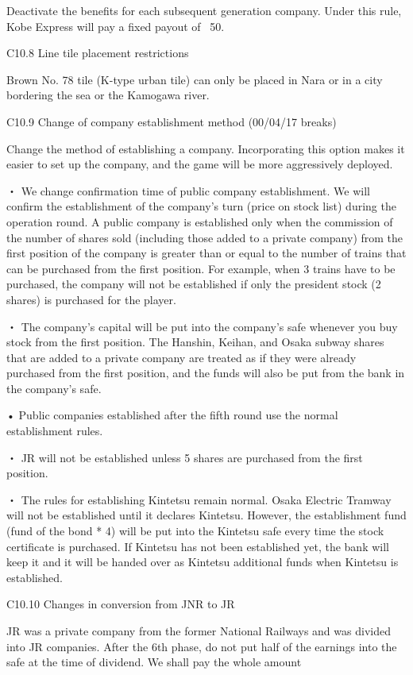 \documentclass{article}
\begin{document}
\begin{CJK}{UTF8}{min}
Deactivate the benefits for each subsequent generation company. Under this rule, Kobe Express will pay a fixed payout of \ 50.

C10.8 Line tile placement restrictions

Brown No. 78 tile (K-type urban tile) can only be placed in Nara or in a city bordering the sea or the Kamogawa river.

C10.9 Change of company establishment method (00/04/17 breaks)

Change the method of establishing a company. Incorporating this option makes it easier to set up the company, and the game will be more aggressively deployed.

・ We change confirmation time of public company establishment. We will confirm the establishment of the company's turn (price on stock list) during the operation round. A public company is established only when the commission of the number of shares sold (including those added to a private company) from the first position of the company is greater than or equal to the number of trains that can be purchased from the first position. For example, when 3 trains have to be purchased, the company will not be established if only the president stock (2 shares) is purchased for the player.

・ The company's capital will be put into the company's safe whenever you buy stock from the first position. The Hanshin, Keihan, and Osaka subway shares that are added to a private company are treated as if they were already purchased from the first position, and the funds will also be put from the bank in the company's safe.

• Public companies established after the fifth round use the normal establishment rules.

・ JR will not be established unless 5 shares are purchased from the first position.

・ The rules for establishing Kintetsu remain normal. Osaka Electric Tramway will not be established until it declares Kintetsu. However, the establishment fund (fund of the bond * 4) will be put into the Kintetsu safe every time the stock certificate is purchased. If Kintetsu has not been established yet, the bank will keep it and it will be handed over as Kintetsu additional funds when Kintetsu is established.

C10.10 Changes in conversion from JNR to JR

JR was a private company from the former National Railways and was divided into JR companies. After the 6th phase, do not put half of the earnings into the safe at the time of dividend. We shall pay the whole amount


\end{CJK}
\end{document}

